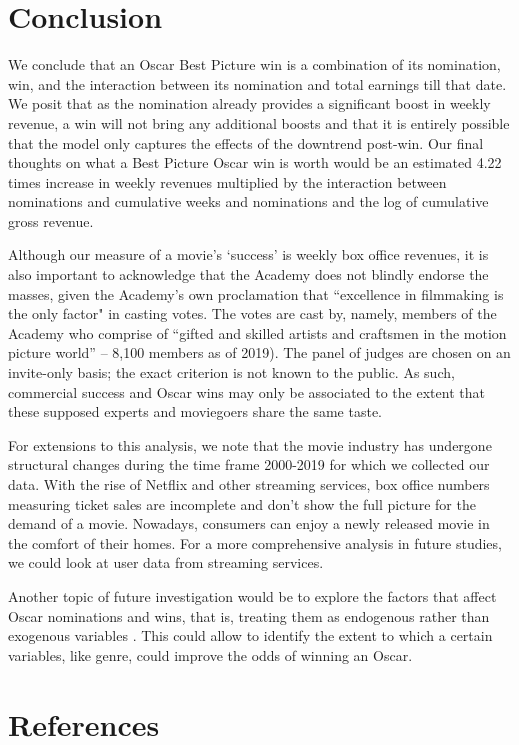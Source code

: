 \documentclass[10.7pt]{article} %
\begin{document}
\section{Conclusion}
We conclude that an Oscar Best Picture win is a combination of its nomination, win, and the interaction between its nomination and total earnings till that date. We posit that as the nomination already provides a significant boost in weekly revenue, a win will not bring any additional boosts and that it is entirely possible that the model only captures the effects of the downtrend post-win. Our final thoughts on what a Best Picture Oscar win is worth would be an estimated 4.22 times increase in weekly revenues multiplied by the interaction between nominations and cumulative weeks and nominations and the log of cumulative gross revenue.

Although our measure of a movie’s ‘success’ is weekly box office revenues, it is also important to acknowledge that the Academy does not blindly endorse the masses, given the Academy’s own proclamation that “excellence in filmmaking is the only factor" in casting votes. The votes are cast by, namely, members of the Academy who comprise of “gifted and skilled artists and craftsmen in the motion picture world” -- 8,100 members as of 2019). The panel of judges are chosen on an invite-only basis; the exact criterion is not known to the public. As such, commercial success and Oscar wins may only be associated to the extent that these supposed experts and moviegoers share the same taste. 

For extensions to this analysis, we note that the movie industry has undergone structural changes during the time frame 2000-2019 for which we collected our data. With the rise of Netflix and other streaming services, box office numbers measuring ticket sales are incomplete and don't show the full picture for the demand of a movie. Nowadays, consumers can enjoy a newly released movie in the comfort of their homes. For a more comprehensive analysis in future studies, we could look at user data from streaming services. 

Another topic of future investigation would be to explore the factors that affect Oscar nominations and wins, that is, treating them as endogenous rather than exogenous variables . This could allow to identify the extent to which a certain variables, like genre, could improve the odds of winning an Oscar. 


\newpage
\section*{References}
\leftskip 0.3in
\parindent -0.3in
\end{document}
